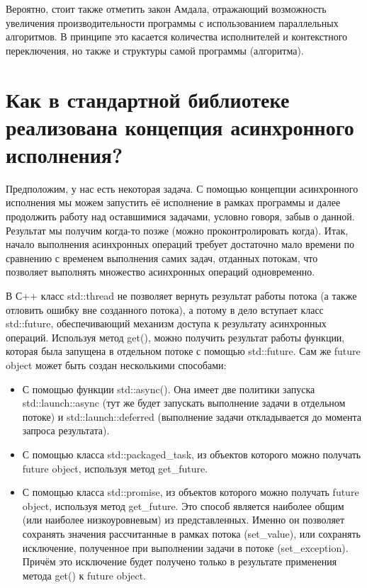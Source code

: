 \documentclass[a4paper,12pt]{article}	%
\begin{document}
	Вероятно, стоит также отметить закон Амдала, отражающий возможность увеличения производительности программы с использованием параллельных алгоритмов. В принципе это касается количества исполнителей и контекстного переключения, но также и структуры самой программы (алгоритма).

\section{Как в стандартной библиотеке реализована концепция асинхронного исполнения?}

	Предположим, у нас есть некоторая задача. С помощью концепции асинхронного исполнения мы можем запустить её исполнение в рамках программы и далее продолжить работу над оставшимися задачами, условно говоря, забыв о данной. Результат мы получим когда-то позже (можно проконтролировать когда). Итак, начало выполнения асинхронных операций требует достаточно мало времени по сравнению с временем выполнения самих задач, отданных потокам, что позволяет выполнять множество асинхронных операций одновременно.
	
	В С++ класс std::thread не позволяет вернуть результат работы потока (а также отловить ошибку вне созданного потока), а потому в дело вступает класс std::future, обеспечивающий механизм доступа к результату асинхронных операций. Используя метод get(), можно получить результат работы функции, которая была запущена в отдельном потоке с помощью std::future. Сам же future object может быть создан несколькими способами:
	
	\begin{itemize}
	
		\item С помощью функции std::async(). Она имеет две политики запуска std::launch::async (тут же будет запускать выполнение задачи в отдельном потоке) и std::launch::deferred (выполнение задачи откладывается до момента запроса результата).
		
		\item С помощью класса std::packaged\_task, из объектов которого можно получать future object, используя метод get\_future.
		
		\item С помощью класса std::promise, из объектов которого можно получать future object, используя метод get\_future. Это способ является наиболее общим (или наиболее низкоуровневым) из представленных. Именно он позволяет сохранять значения рассчитанные в рамках потока (set\_value), или сохранять исключение, полученное при выполнении задачи в потоке (set\_exception). Причём это исключение будет получено только в результате применения метода get() к future object.
	
	\end{itemize}
	
\end{document}
